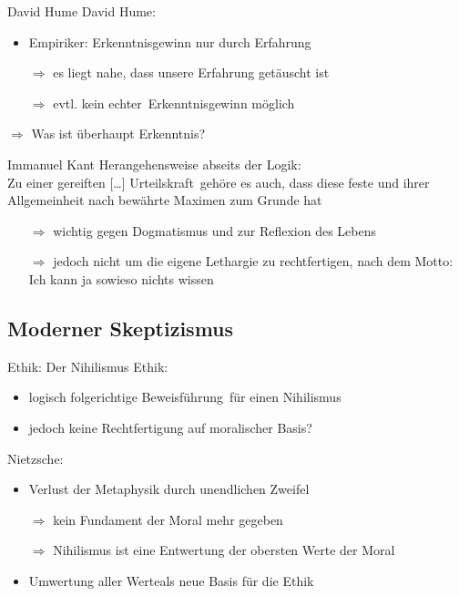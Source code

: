 \documentclass[12pt]{beamer}
\begin{document}
\begin{frame}{David Hume}
David Hume:
\begin{itemize}
\item Empiriker: Erkenntnisgewinn nur durch Erfahrung
\item[$\Rightarrow$] es liegt nahe, dass unsere Erfahrung getäuscht ist
\item[$\Rightarrow$] evtl. kein \glqq echter\grqq\ Erkenntnisgewinn möglich
\end{itemize}
$\Rightarrow$ Was ist überhaupt \glqq Erkenntnis\grqq ?
\end{frame}

\begin{frame}{Immanuel Kant}
Herangehensweise abseits der Logik:\\
Zu einer  \glqq gereiften [\ldots] Urteilskraft\grqq\ gehöre es auch, dass diese \glqq feste und ihrer Allgemeinheit nach bewährte Maximen zum Grunde hat\grqq\ %
\begin{itemize}
\item[$\Rightarrow$] wichtig gegen Dogmatismus und zur Reflexion des Lebens
\item[$\Rightarrow$] jedoch nicht um die eigene Lethargie zu rechtfertigen, nach dem Motto:\\
\glqq Ich kann ja sowieso nichts wissen\grqq
\end{itemize}
\end{frame}

\subsection{Moderner Skeptizismus}
\begin{frame}{Ethik: Der Nihilismus}
Ethik:\\
\begin{itemize}
\item logisch folgerichtige \glqq Beweisführung\grqq\ für einen Nihilismus
\item jedoch keine Rechtfertigung auf moralischer Basis?
\end{itemize}
Nietzsche:\\
\begin{itemize}
\item Verlust der Metaphysik durch unendlichen Zweifel
\item[$\Rightarrow$] kein Fundament der Moral mehr gegeben
\item[$\Rightarrow$] Nihilismus ist eine Entwertung der obersten Werte der Moral
\item \glqq Umwertung aller Werte\grqq als neue Basis für die Ethik
\end{itemize}
\end{frame}
\end{document}
